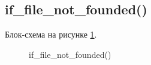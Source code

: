 \subsection{if\_file\_not\_founded()}

Блок-схема на рисунке \ref{fig:if_file_not_founded}.

\begin{figure}[p]
    \caption{if\_file\_not\_founded()}
    \label{fig:if_file_not_founded}
\end{figure}





\newpage